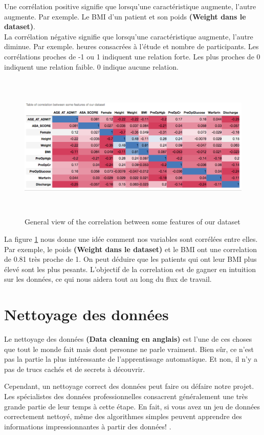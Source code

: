 \documentclass[12pt, french]{report}
\begin{document}
Une corrélation positive signifie que lorsqu'une caractéristique augmente, l'autre augmente. Par exemple. Le BMI d'un patient et son poids\textbf{ (Weight dans le dataset)}.\\

La corrélation négative signifie que lorsqu'une caractéristique augmente, l'autre diminue. Par exemple. heures consacrées à l'étude et nombre de participants. Les corrélations proches de -1 ou 1 indiquent une relation forte. Les plus proches de 0 indiquent une relation faible. 0 indique aucune relation.

\begin{figure}[h]
\includegraphics[width=17.5cm, height =7cm]{images/correlation.png}
\caption{General view of the correlation between some features of our dataset}
\label{fig:correlation}
\end{figure}

La figure \ref{fig:correlation} nous donne une idée comment nos variables sont corrélées entre elles. Par exemple, le poids \textbf{ (Weight dans le dataset)} et le BMI ont une correlation de 0.81 très proche de 1. On peut déduire que les patients qui ont leur BMI plus élevé sont les plus pesants. L'objectif de la correlation est de gagner en intuition sur les données, ce qui nous aidera tout au long du flux de travail.   

\section{Nettoyage des données}
Le nettoyage des données \textbf{(Data cleaning en anglais)} est l'une de ces choses que tout le monde fait mais dont personne ne parle vraiment. Bien sûr, ce n'est pas la partie la plus intéressante de l'apprentissage automatique. Et non, il n'y a pas de trucs cachés et de secrets à découvrir.

Cependant, un nettoyage correct des données peut faire ou défaire notre projet. Les spécialistes des données professionnelles consacrent généralement une très grande partie de leur temps à cette étape. En fait, si vous avez un jeu de données correctement nettoyé, même des algorithmes simples peuvent apprendre des informations impressionnantes à partir des données! \cite{key21}.
\end{document}
